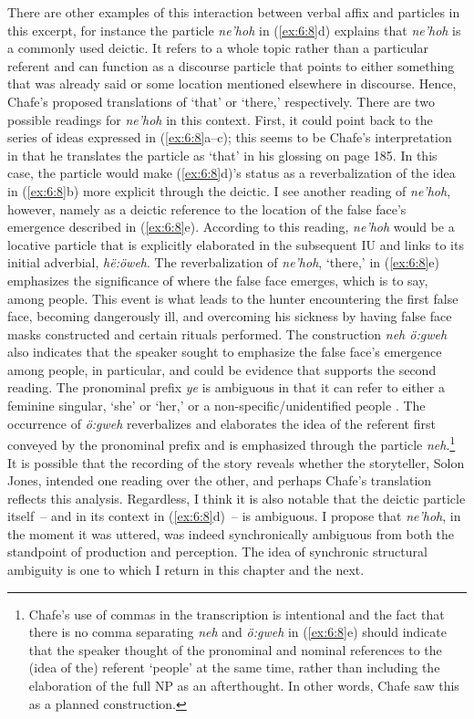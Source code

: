 There are other examples of this interaction between verbal affix and particles in this excerpt, for instance the particle \textit{ne’hoh} in (\ref{ex:6:8}d) \citet[119; 122--123]{Chafe2014} explains that \textit{ne’hoh} is a commonly used deictic. It refers to a whole topic rather than a particular referent and can function as a discourse particle that points to either something that was already said or some location mentioned elsewhere in discourse. Hence, Chafe’s proposed translations of ‘that’ or ‘there,’ respectively. There are two possible readings for \textit{ne’hoh} in this context. First, it could point back to the series of ideas expressed in (\ref{ex:6:8}a--c); this seems to be Chafe’s interpretation in that he translates the particle as ‘that’ in his glossing on page 185. In this case, the particle would make (\ref{ex:6:8}d)’s status as a reverbalization of the idea in (\ref{ex:6:8}b) more explicit through the deictic. I see another reading of \textit{ne’hoh}, however, namely as a deictic reference to the location of the false face’s emergence described in (\ref{ex:6:8}e). According to this reading, \textit{ne’hoh} would be a locative particle that is explicitly elaborated in the subsequent IU and links to its initial adverbial, \textit{hë:öweh}. The reverbalization of \textit{ne’hoh}, ‘there,’ in (\ref{ex:6:8}e) emphasizes the significance of where the false face emerges, which is to say, among people. This event is what leads to the hunter encountering the first false face, becoming dangerously ill, and overcoming his sickness by having false face masks constructed and certain rituals performed. The construction \textit{neh ö:gweh} also indicates that the speaker sought to emphasize the false face’s emergence among people, in particular, and could be evidence that supports the second reading. The pronominal prefix \textit{ye} is ambiguous in that it can refer to either a feminine singular, ‘she’ or ‘her,' or a non-specific/unidentified people \citep[32]{Chafe2014}. The occurrence of \textit{ö:gweh} reverbalizes and elaborates the idea of the referent first conveyed by the pronominal prefix and is emphasized through the particle \textit{neh}.\footnote{Chafe’s use of commas in the transcription is intentional and the fact that there is no comma separating \textit{neh} and \textit{ö:gweh} in (\ref{ex:6:8}e) should indicate that the speaker thought of the pronominal and nominal references to the (idea of the) referent ‘people’ at the same time, rather than including the elaboration of the full NP as an afterthought. In other words, Chafe saw this as a planned construction.} It is possible that the recording of the story reveals whether the storyteller, Solon Jones, intended one reading over the other, and perhaps Chafe’s translation reflects this analysis. Regardless, I think it is also notable that the deictic particle itself~-- and in its context in (\ref{ex:6:8}d)~-- is ambiguous. I propose that \textit{ne’hoh}, in the moment it was uttered, was indeed synchronically ambiguous from both the standpoint of production and perception. The idea of synchronic structural ambiguity is one to which I return in this chapter and the next.


